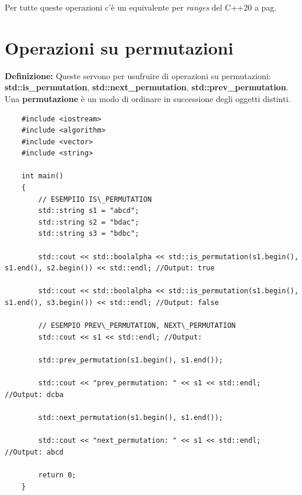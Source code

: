 
\fleuron

\textsf{\small Per tutte queste operazioni c'è un equivalente per \emph{ranges} del C++20 a pag. \pageref{ranges}} \\


\newpage

\section{Operazioni su permutazioni}

\textsf{\small \textbf{Definizione: } Queste servono per usufruire di operazioni su permutazioni: \textbf{std::is\_permutation}, \textbf{std::next\_permutation}, \textbf{std::prev\_permutation}.} \\

\textsf{\small Una \textbf{permutazione} è un modo di ordinare in successione degli oggetti distinti.} \\

\begin{lstlisting}
	#include <iostream>
	#include <algorithm>
	#include <vector>
	#include <string>
	
	int main()
	{
		// ESEMPIIO IS\_PERMUTATION
		std::string s1 = "abcd";
		std::string s2 = "bdac";
		std::string s3 = "bdbc";
		
		std::cout << std::boolalpha << std::is_permutation(s1.begin(), s1.end(), s2.begin()) << std::endl; //Output: true
		
		std::cout << std::boolalpha << std::is_permutation(s1.begin(), s1.end(), s3.begin()) << std::endl; //Output: false
		
		// ESEMPIO PREV\_PERMUTATION, NEXT\_PERMUTATION
		std::cout << s1 << std::endl; //Output: 
		
		std::prev_permutation(s1.begin(), s1.end());
		
		std::cout << "prev_permutation: " << s1 << std::endl; //Output: dcba
		
		std::next_permutation(s1.begin(), s1.end());
		
		std::cout << "next_permutation: " << s1 << std::endl; //Output: abcd
		
		return 0;
	}
\end{lstlisting}

\fleuron

